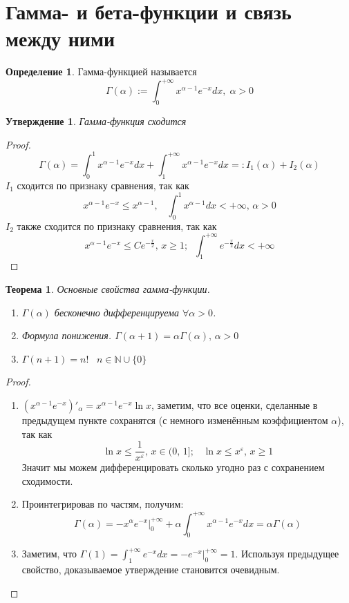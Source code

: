 \documentclass[a4paper,12pt]{article}
\renewcommand{\leq}{\ensuremath{\leqslant}}
\renewcommand{\geq}{\ensuremath{\geqslant}}
\theoremstyle{plain}
\newtheorem{theorem}{Теорема}[section]
\newtheorem{proposition}{Утверждение}[section]
\theoremstyle{definition}
\newtheorem{definition}{Определение}[section]
\theoremstyle{remark}
\begin{document}
\section{Гамма- и бета-функции и связь между ними}
\begin{definition}
	Гамма-функцией называется
	\[\Gamma(\alpha) := \int_0^{+\infty}x^{\alpha - 1}e^{-x}dx,\; \alpha > 0\]
\end{definition}

\begin{proposition}
	Гамма-функция сходится
\end{proposition}

\begin{proof}
	\[\Gamma(\alpha) = \int_0^1 x^{\alpha - 1}e^{-x}dx + \int_1^{+\infty} x^{\alpha - 1}e^{-x}dx =: I_1(\alpha) + I_2(\alpha)\]
	$I_1$ сходится по признаку сравнения, так как
	\[x^{\alpha - 1}e^{-x} \leq x^{\alpha - 1},\;\;\; \int_0^1 x^{\alpha - 1}dx < +\infty,\, \alpha > 0\]
	$I_2$ также сходится по признаку сравнения, так как
	\[x^{\alpha - 1}e^{-x} \leq Ce^{-\frac{x}{2}},\, x \geq 1 ;\;\; \int_1^{+\infty} e^{-\frac{x}{2}}dx < +\infty\]
\end{proof}

\begin{theorem}
	Основные свойства гамма-функции.

	\begin{enumerate}
		\item $\Gamma(\alpha)$ бесконечно дифференцируема $\forall \alpha > 0$.
		\item Формула понижения. $\Gamma(\alpha + 1) = \alpha\Gamma(\alpha),\, \alpha > 0$
		\item $\Gamma(n + 1) = n!\;\;\; n \in \mathbb{N} \cup \{0\}$
	\end{enumerate}
\end{theorem}
\begin{proof}
	\begin{enumerate}
		\item $(x^{\alpha - 1}e^{-x})'_\alpha = x^{\alpha - 1}e^{-x}\ln x$, заметим, что все оценки, сделанные в предыдущем пункте сохранятся (с немного изменённым коэффициентом $\alpha$), так как
		      \[\ln x \leq \frac{1}{x^\varepsilon},\,x\in(0,\,1];\;\;\; \ln x \leq x^\varepsilon,\, x \geq 1\]
		      Значит мы можем дифференцировать сколько угодно раз с сохранением сходимости.
		\item Проинтегрировав по частям, получим:
		      \[\Gamma(\alpha) = -x^\alpha e^{-x}|^{+\infty}_0 + \alpha\int_0^{+\infty}x^{\alpha - 1}e^{-x}dx = \alpha\Gamma(\alpha)\]
		\item Заметим, что $\Gamma(1) = \int_1^{+\infty} e^{-x}dx = -e^{-x}|^{+\infty}_0 = 1$. Используя предыдущее свойство, доказываемое утверждение становится очевидным.
	\end{enumerate}
\end{proof}
\end{document}
